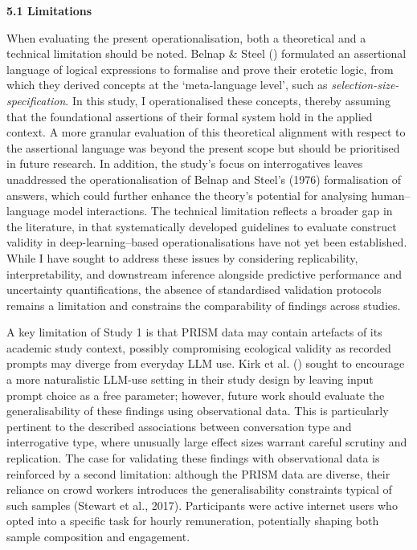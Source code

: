 \documentclass[
  12pt,
]{article}
\begin{document}
\textbf{5.1 Limitations}

When evaluating the present operationalisation, both a theoretical and a technical limitation should be noted. Belnap \& Steel () formulated an assertional language of logical expressions to formalise and prove their erotetic logic, from which they derived concepts at the `meta-language level', such as \emph{selection-size-specification}. In this study, I operationalised these concepts, thereby assuming that the foundational assertions of their formal system hold in the applied context. A more granular evaluation of this theoretical alignment with respect to the assertional language was beyond the present scope but should be prioritised in future research. In addition, the study's focus on interrogatives leaves unaddressed the operationalisation of Belnap and Steel's (1976) formalisation of answers, which could further enhance the theory's potential for analysing human--language model interactions. The technical limitation reflects a broader gap in the literature, in that systematically developed guidelines to evaluate construct validity in deep-learning--based operationalisations have not yet been established. While I have sought to address these issues by considering replicability, interpretability, and downstream inference alongside predictive performance and uncertainty quantifications, the absence of standardised validation protocols remains a limitation and constrains the comparability of findings across studies.

A key limitation of Study 1 is that PRISM data may contain artefacts of its academic study context, possibly compromising ecological validity as recorded prompts may diverge from everyday LLM use. Kirk et al. () sought to encourage a more naturalistic LLM-use setting in their study design by leaving input prompt choice as a free parameter; however, future work should evaluate the generalisability of these findings using observational data. This is particularly pertinent to the described associations between conversation type and interrogative type, where unusually large effect sizes warrant careful scrutiny and replication. The case for validating these findings with observational data is reinforced by a second limitation: although the PRISM data are diverse, their reliance on crowd workers introduces the generalisability constraints typical of such samples (Stewart et al., 2017). Participants were active internet users who opted into a specific task for hourly remuneration, potentially shaping both sample composition and engagement.
\end{document}
